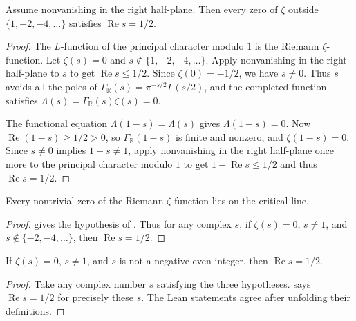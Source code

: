 \begin{lemma}
\label{lem:zeta-reflection}
\emitthmsource
Assume nonvanishing in the right half-plane. Then every zero of $\zeta$ outside $\{1,-2,-4,\dots\}$ satisfies $\operatorname{Re}s=1/2$.
\end{lemma}
\begin{proof}
The $L$-function of the principal character modulo $1$ is the Riemann $\zeta$-function. Let $\zeta(s)=0$ and $s\notin\{1,-2,-4,\ldots\}$. Apply nonvanishing in the right half-plane to $s$ to get $\operatorname{Re}s\le1/2$. Since $\zeta(0)=-1/2$, we have $s\ne0$. Thus $s$ avoids all the poles of $\Gamma_{\mathbb R}(s)=\pi^{-s/2}\Gamma(s/2)$, and the completed function satisfies $\Lambda(s)=\Gamma_{\mathbb R}(s)\zeta(s)=0$.

The functional equation $\Lambda(1-s)=\Lambda(s)$ gives $\Lambda(1-s)=0$. Now $\operatorname{Re}(1-s)\ge1/2>0$, so $\Gamma_{\mathbb R}(1-s)$ is finite and nonzero, and $\zeta(1-s)=0$. Since $s\ne0$ implies $1-s\ne1$, apply nonvanishing in the right half-plane once more to the principal character modulo $1$ to get $1-\operatorname{Re}s\le1/2$ and thus $\operatorname{Re}s=1/2$.
\end{proof}

\begin{theorem}
\label{thm:rh}
\emitthmsource
Every nontrivial zero of the Riemann $\zeta$-function lies on the critical line.
\end{theorem}
\begin{proof}
 gives the hypothesis of . Thus for any complex $s$, if $\zeta(s)=0$, $s\ne1$, and $s\notin\{-2,-4,\ldots\}$, then $\operatorname{Re}s=1/2$.
\end{proof}

\begin{theorem}
\label{thm:zeta-zeros}
\emitthmsource
If $\zeta(s)=0$, $s\ne1$, and $s$ is not a negative even integer, then $\operatorname{Re}s=1/2$.
\end{theorem}
\begin{proof}
Take any complex number $s$ satisfying the three hypotheses.  says $\operatorname{Re}s=1/2$ for precisely these $s$. The Lean statements agree after unfolding their definitions.
\end{proof}

